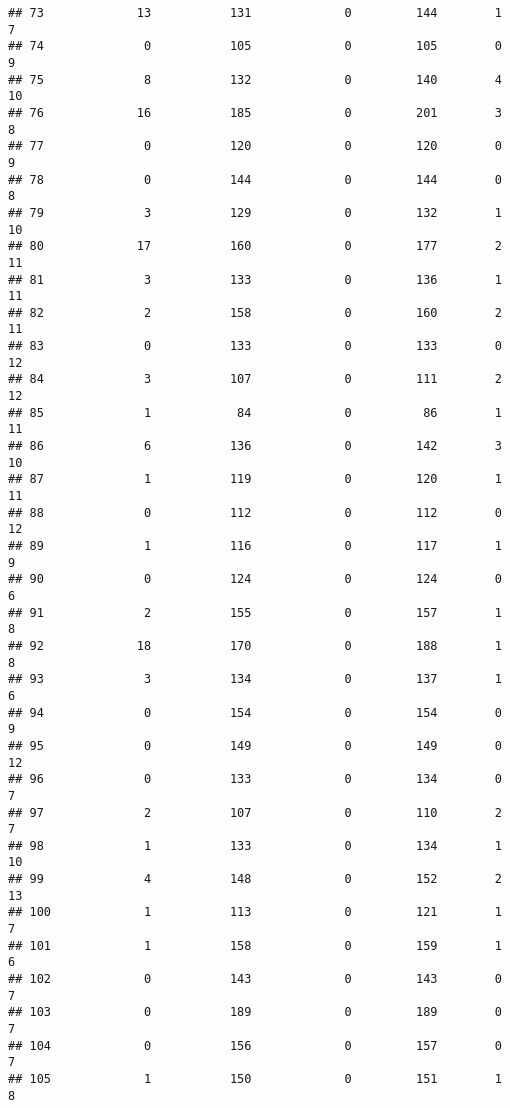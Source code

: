\documentclass[]{article}
\begin{document}
\begin{verbatim}
## 73             13           131             0         144        1        7
## 74              0           105             0         105        0        9
## 75              8           132             0         140        4       10
## 76             16           185             0         201        3        8
## 77              0           120             0         120        0        9
## 78              0           144             0         144        0        8
## 79              3           129             0         132        1       10
## 80             17           160             0         177        2       11
## 81              3           133             0         136        1       11
## 82              2           158             0         160        2       11
## 83              0           133             0         133        0       12
## 84              3           107             0         111        2       12
## 85              1            84             0          86        1       11
## 86              6           136             0         142        3       10
## 87              1           119             0         120        1       11
## 88              0           112             0         112        0       12
## 89              1           116             0         117        1        9
## 90              0           124             0         124        0        6
## 91              2           155             0         157        1        8
## 92             18           170             0         188        1        8
## 93              3           134             0         137        1        6
## 94              0           154             0         154        0        9
## 95              0           149             0         149        0       12
## 96              0           133             0         134        0        7
## 97              2           107             0         110        2        7
## 98              1           133             0         134        1       10
## 99              4           148             0         152        2       13
## 100             1           113             0         121        1        7
## 101             1           158             0         159        1        6
## 102             0           143             0         143        0        7
## 103             0           189             0         189        0        7
## 104             0           156             0         157        0        7
## 105             1           150             0         151        1        8

\end{verbatim}
\end{document}
